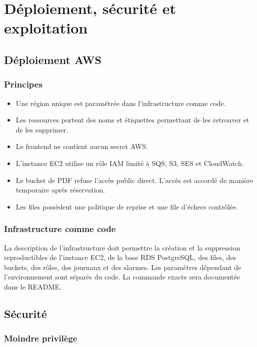 \section{Déploiement, sécurité et exploitation}

\subsection{Déploiement AWS}

\subsubsection{Principes}

\begin{itemize}
\item Une région unique est paramétrée dans l'infrastructure comme code.
\item Les ressources portent des noms et étiquettes permettant de les retrouver et de les supprimer.
\item Le frontend ne contient aucun secret AWS.
\item L'instance EC2 utilise un rôle IAM limité à SQS, S3, SES et CloudWatch.
\item Le bucket de PDF refuse l'accès public direct. L'accès est accordé de manière temporaire après réservation.
\item Les files possèdent une politique de reprise et une file d'échecs contrôlée.
\end{itemize}

\subsubsection{Infrastructure comme code}

La description de l'infrastructure doit permettre la création et la suppression reproductibles de l'instance EC2, de la base RDS PostgreSQL, des files, des buckets, des rôles, des journaux et des alarmes. Les paramètres dépendant de l'environnement sont séparés du code. La commande exacte sera documentée dans le README.


\subsection{Sécurité}
\subsubsection{Moindre privilège}

